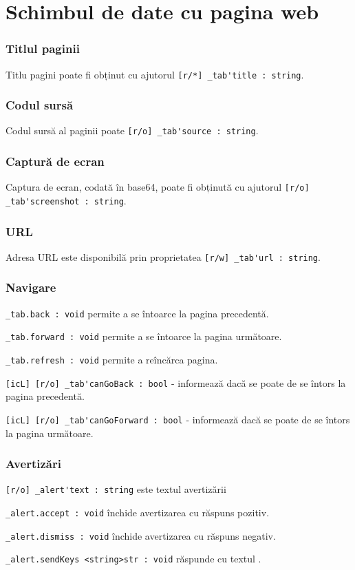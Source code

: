 \section{Schimbul de date cu pagina web}
\label{dataexchange}

\subsubsection{Titlul paginii}

Titlu pagini poate fi obținut cu ajutorul \lstinline|[r/*] _tab'title : string|.

\subsubsection{Codul sursă}

Codul sursă al paginii poate \lstinline|[r/o] _tab'source : string|.

\subsubsection{Captură de ecran}

Captura de ecran, codată în base64, poate fi obținută cu ajutorul \lstinline|[r/o] _tab'screenshot : string|.

\subsubsection{URL}

Adresa URL este disponibilă prin proprietatea \lstinline|[r/w] _tab'url : string|.

\subsubsection{Navigare}

\lstinline|_tab.back : void| permite a se întoarce la pagina precedentă.

\lstinline|_tab.forward : void| permite a se întoarce la pagina următoare.

\lstinline|_tab.refresh : void|  permite a reîncărca pagina.

\lstinline|[icL] [r/o] _tab'canGoBack : bool| - informează dacă se poate de se întors la pagina precedentă.

\lstinline|[icL] [r/o] _tab'canGoForward : bool| - informează dacă se poate de se întors la pagina următoare.


\subsubsection{Avertizări}

\lstinline|[r/o] _alert'text : string| este textul avertizării

\lstinline|_alert.accept : void| închide avertizarea cu răspuns pozitiv.

\lstinline|_alert.dismiss : void| închide avertizarea cu răspuns negativ.

\lstinline|_alert.sendKeys <string>str : void| răspunde cu textul .

